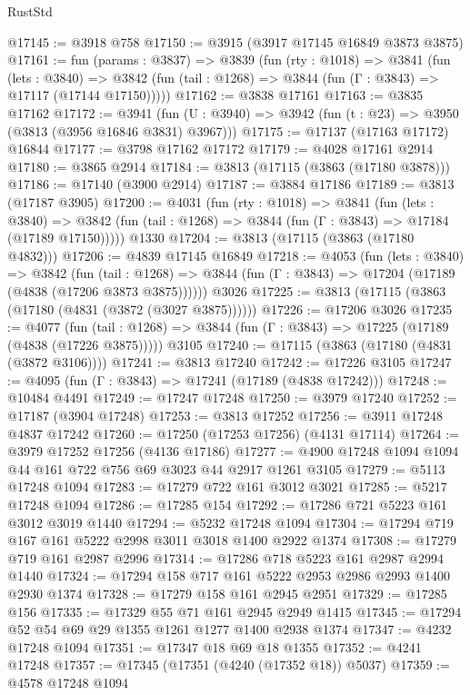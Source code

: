 \begin{lexlean}{RustStd}
\begin{coremodule}
{\begin{coremodule}
{{{{{{{{{{{{{{{{{{{{{{{{{{{{{{{{{{{@17145 := @3918 @758
@17150 := @3915 (@3917 @17145 @16849 @3873 @3875)
@17161 := fun (params : @3837) =>
  @3839
    (fun (rty : @1018) =>
    @3841
      (fun (lets : @3840) =>
      @3842 (fun (tail : @1268) => @3844 (fun (Γ : @3843) => @17117 (@17144 @17150)))))
@17162 := @3838 @17161
@17163 := @3835 @17162
@17172 := @3941
    (fun (U : @3940) => @3942 (fun (t : @23) => @3950 (@3813 (@3956 @16846 @3831) @3967)))
@17175 := @17137 (@17163 @17172) @16844
@17177 := @3798 @17162 @17172
@17179 := @4028 @17161 @2914
@17180 := @3865 @2914
@17184 := @3813 (@17115 (@3863 (@17180 @3878)))
@17186 := @17140 (@3900 @2914)
@17187 := @3884 @17186
@17189 := @3813 (@17187 @3905)
@17200 := @4031
    (fun (rty : @1018) =>
    @3841
      (fun (lets : @3840) =>
      @3842 (fun (tail : @1268) => @3844 (fun (Γ : @3843) => @17184 (@17189 @17150)))))
    @1330
@17204 := @3813 (@17115 (@3863 (@17180 @4832)))
@17206 := @4839 @17145 @16849
@17218 := @4053
    (fun (lets : @3840) =>
    @3842
      (fun (tail : @1268) =>
      @3844 (fun (Γ : @3843) => @17204 (@17189 (@4838 (@17206 @3873 @3875))))))
    @3026
@17225 := @3813 (@17115 (@3863 (@17180 (@4831 (@3872 (@3027 @3875))))))
@17226 := @17206 @3026
@17235 := @4077
    (fun (tail : @1268) => @3844 (fun (Γ : @3843) => @17225 (@17189 (@4838 (@17226 @3875)))))
    @3105
@17240 := @17115 (@3863 (@17180 (@4831 (@3872 @3106))))
@17241 := @3813 @17240
@17242 := @17226 @3105
@17247 := @4095 (fun (Γ : @3843) => @17241 (@17189 (@4838 @17242)))
@17248 := @10484 @4491
@17249 := @17247 @17248
@17250 := @3979 @17240
@17252 := @17187 (@3904 @17248)
@17253 := @3813 @17252
@17256 := @3911 @17248 @4837 @17242
@17260 := @17250 (@17253 @17256) (@4131 @17114)
@17264 := @3979 @17252 @17256 (@4136 @17186)
@17277 := @4900 @17248 @1094 @1094 @44 @161 @722 @756 @69 @3023 @44 @2917 @1261 @3105
@17279 := @5113 @17248 @1094
@17283 := @17279 @722 @161 @3012 @3021
@17285 := @5217 @17248 @1094
@17286 := @17285 @154
@17292 := @17286 @721 @5223 @161 @3012 @3019 @1440
@17294 := @5232 @17248 @1094
@17304 := @17294 @719 @167 @161 @5222 @2998 @3011 @3018 @1400 @2922 @1374
@17308 := @17279 @719 @161 @2987 @2996
@17314 := @17286 @718 @5223 @161 @2987 @2994 @1440
@17324 := @17294 @158 @717 @161 @5222 @2953 @2986 @2993 @1400 @2930 @1374
@17328 := @17279 @158 @161 @2945 @2951
@17329 := @17285 @156
@17335 := @17329 @55 @71 @161 @2945 @2949 @1415
@17345 := @17294 @52 @54 @69 @29 @1355 @1261 @1277 @1400 @2938 @1374
@17347 := @4232 @17248 @1094
@17351 := @17347 @18 @69 @18 @1355
@17352 := @4241 @17248
@17357 := @17345 (@17351 (@4240 (@17352 @18)) @5037)
@17359 := @4578 @17248 @1094
}}}}}}}}}}}}}}}}}}}}}}}}}}}}}}}}}}}
\end{coremodule}}
\end{coremodule}
\end{lexlean}
